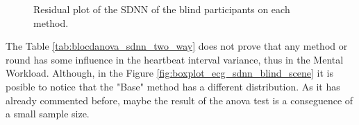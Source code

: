 \begin{figure}[!htb]
\begin{minipage}{0.45\textwidth}
        \caption{Residual plot of the SDNN of the blind participants on each method.}
        \label{fig:residplot_sdnn_two_way}
    \end{minipage}
\end{figure}

%

The Table \ref{tab:blocdanova_sdnn_two_way} does not prove that any method or round has some influence in the heartbeat interval variance, thus in the Mental Workload. Although, in the Figure \ref{fig:boxplot_ecg_sdnn_blind_scene} it is posible to notice that the "Base" method has a different distribution. As it has already commented before, maybe the result of the anova test is a conseguence of a small sample size.

\FloatBarrier